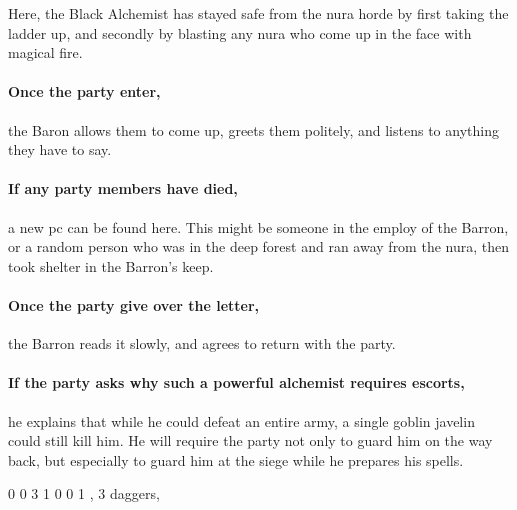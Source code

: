 \begin{multicols}{2}
\begin{enumerate}
\end{enumerate}

\lootMagic 


Here, the Black Alchemist has stayed safe from the nura horde by first taking the ladder up, and secondly by blasting any nura who come up in the face with magical fire.

\paragraph{Once the party enter,}
the Baron allows them to come up, greets them politely, and listens to anything they have to say.


\paragraph{If any party members have died,}
a new \gls{pc} can be found here.
This might be someone in the employ of the Barron, or a random person who was in the deep forest and ran away from the nura, then took shelter in the Barron's keep.

\paragraph{Once the party give over the letter,}
the Barron reads it slowly, and agrees to return with the party.

\paragraph{If the party asks why such a powerful alchemist requires escorts,}
he explains that while he could defeat an entire army, a single goblin javelin could still kill him.
He will require the party not only to guard him on the way back, but especially to guard him at the siege while he prepares his spells.

{0}%
{0}%
{{3}%
{1}%
{0}}%
{0}%
{1}%
{\setcounter{Projectiles}{1}\setcounter{Academics}{2}\setcounter{Crafts}{1}\setcounter{Deceit}{1}\setcounter{Medicine}{2}\setcounter{Vigilance}{1}}%
{\shortsword, 3 daggers, \partialleather}%
{
  \addtocounter{fp}{10}
  \setcounter{Fire}{3}
  \setcounter{Air}{2}
  \setcounter{Earth}{1}
}

\showStdSpells

\end{multicols}

